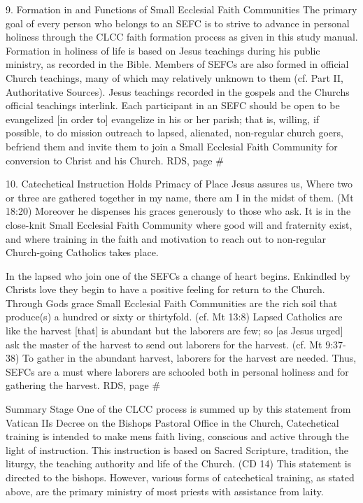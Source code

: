\documentclass[oneside]{book}
\begin{document}
9. Formation in and Functions of Small Ecclesial Faith Communities The primary
goal of every person who belongs to an SEFC is to strive to advance in personal
holiness through the CLCC faith formation process as given in this study
manual. Formation in holiness of life is based on Jesus teachings during his
public ministry, as recorded in the Bible. Members of SEFCs are also formed in
official Church teachings, many of which may relatively unknown to them
(cf. Part II, Authoritative Sources). Jesus teachings recorded in the gospels
and the Churchs official teachings interlink. Each participant in an SEFC should
be open to be evangelized [in order to] evangelize in his or her parish; that
is, willing, if possible, to do mission outreach to lapsed, alienated,
non-regular church goers, befriend them and invite them to join a Small
Ecclesial Faith Community for conversion to Christ and his Church.  RDS, page \#

10. Catechetical Instruction Holds Primacy of Place Jesus assures us, Where two
or three are gathered together in my name, there am I in the midst of them. (Mt
18:20) Moreover he dispenses his graces generously to those who ask. It is in
the close-knit Small Ecclesial Faith Community where good will and fraternity
exist, and where training in the faith and motivation to reach out to
non-regular Church-going Catholics takes place.

In the lapsed who join one of the SEFCs a change of heart begins. Enkindled by
Christs love they begin to have a positive feeling for return to the
Church. Through Gods grace Small Ecclesial Faith Communities are the rich soil
that produce(s) a hundred or sixty or thirtyfold. (cf. Mt 13:8) Lapsed Catholics
are like the harvest [that] is abundant but the laborers are few; so [as Jesus
urged] ask the master of the harvest to send out laborers for the
harvest. (cf. Mt 9:37-38) To gather in the abundant harvest, laborers for the
harvest are needed. Thus, SEFCs are a must where laborers are schooled both in
personal holiness and for gathering the harvest.  RDS, page \#

Summary Stage One of the CLCC process is summed up by this statement from
Vatican IIs Decree on the Bishops Pastoral Office in the Church, Catechetical
training is intended to make mens faith living, conscious and active through the
light of instruction. This instruction is based on Sacred Scripture, tradition,
the liturgy, the teaching authority and life of the Church. (CD 14) This
statement is directed to the bishops. However, various forms of catechetical
training, as stated above, are the primary ministry of most priests with
assistance from laity.
\end{document}
